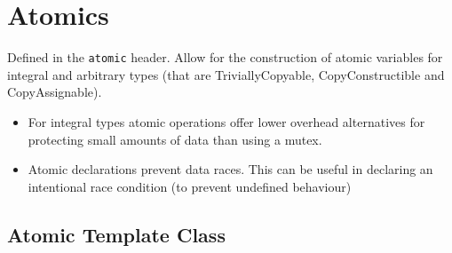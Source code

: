 \section{Atomics}
Defined in the \texttt{atomic} header. Allow for the construction of atomic variables for integral and arbitrary types (that are TriviallyCopyable, CopyConstructible and CopyAssignable).
\begin{itemize}
  \item For integral types atomic operations offer lower overhead alternatives for protecting small amounts of data than using a mutex.
  \item Atomic declarations prevent data races. This can be useful in declaring an intentional race condition (to prevent undefined behaviour)
\end{itemize}
\subsection{Atomic Template Class}
